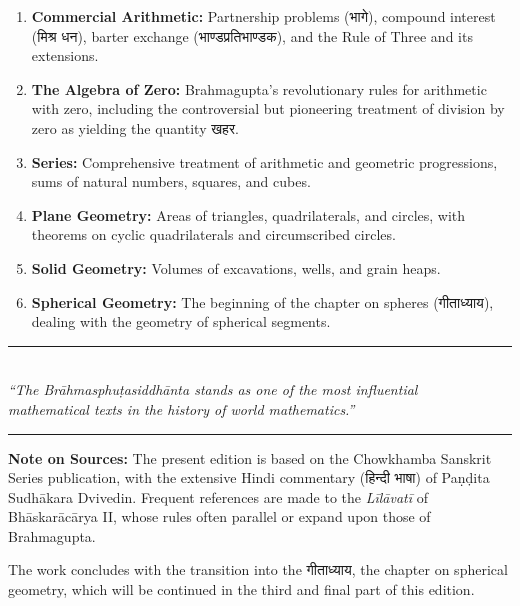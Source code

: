 \documentclass[11pt,a4paper]{article}
\newcommand{\longline}{\noindent\rule{\textwidth}{0.4pt}}
\newcommand{\dev}[1]{{\devanagarifont #1}}
\begin{document}
\begin{enumerate}
    \item \textbf{Commercial Arithmetic:} Partnership problems (\dev{भागे}), compound interest (\dev{मिश्र धन}), barter exchange (\dev{भाण्डप्रतिभाण्डक}), and the Rule of Three and its extensions.
    
    \item \textbf{The Algebra of Zero:} Brahmagupta's revolutionary rules for arithmetic with zero, including the controversial but pioneering treatment of division by zero as yielding the quantity \dev{खहर}.
    
    \item \textbf{Series:} Comprehensive treatment of arithmetic and geometric progressions, sums of natural numbers, squares, and cubes.
    
    \item \textbf{Plane Geometry:} Areas of triangles, quadrilaterals, and circles, with theorems on cyclic quadrilaterals and circumscribed circles.
    
    \item \textbf{Solid Geometry:} Volumes of excavations, wells, and grain heaps.
    
    \item \textbf{Spherical Geometry:} The beginning of the chapter on spheres (\dev{गीताध्याय}), dealing with the geometry of spherical segments.
\end{enumerate}

\vspace{1em}
\begin{center}
\longline\\[0.5em]
\textit{``The \textit{Brāhmasphuṭasiddhānta} stands as one of the most influential}\\
\textit{mathematical texts in the history of world mathematics.''}\\[0.5em]
\longline
\end{center}

\vspace{2em}
\noindent\textbf{Note on Sources:} The present edition is based on the Chowkhamba Sanskrit Series publication, with the extensive Hindi commentary (\dev{हिन्दी भाषा}) of Paṇḍita Sudhākara Dvivedin. Frequent references are made to the \textit{Līlāvatī} of Bhāskarācārya II, whose rules often parallel or expand upon those of Brahmagupta.

\vspace{1em}
\noindent The work concludes with the transition into the \dev{गीताध्याय}, the chapter on spherical geometry, which will be continued in the third and final part of this edition.
\end{document}
